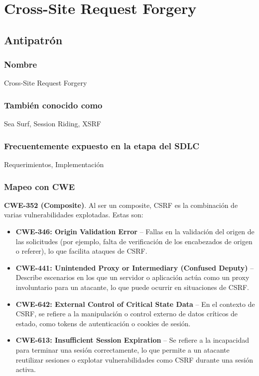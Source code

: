 \chapter{Cross-Site Request Forgery}
\section{Antipatrón}
\subsection*{Nombre} 
Cross-Site Request Forgery

\subsection*{También conocido como} 
Sea Surf, Session Riding, XSRF

\subsection*{Frecuentemente expuesto en la etapa del SDLC} 
Requerimientos, Implementación

\subsection*{Mapeo con CWE} \textbf{CWE-352 (Composite)}. Al ser un composite, CSRF es la combinación de varias vulnerabilidades explotadas. Estas son: 
\begin{itemize}
    \item \textbf{CWE-346: Origin Validation Error} – Fallas en la validación del origen de las solicitudes (por ejemplo, falta de verificación de los encabezados de origen o referer), lo que facilita ataques de CSRF.
    \item \textbf{CWE-441: Unintended Proxy or Intermediary (Confused Deputy)} – Describe escenarios en los que un servidor o aplicación actúa como un proxy involuntario para un atacante, lo que puede ocurrir en situaciones de CSRF.
    \item \textbf{CWE-642: External Control of Critical State Data} – En el contexto de CSRF, se refiere a la manipulación o control externo de datos críticos de estado, como tokens de autenticación o cookies de sesión.
    \item \textbf{CWE-613: Insufficient Session Expiration} – Se refiere a la incapacidad para terminar una sesión correctamente, lo que permite a un atacante reutilizar sesiones o explotar vulnerabilidades como CSRF durante una sesión activa.
\end{itemize}
